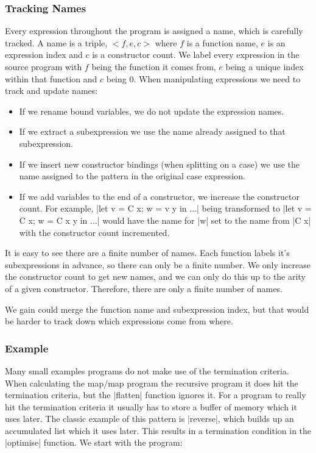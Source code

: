 \documentclass[draft]{sigplanconf}
\begin{document}
\subsubsection{Tracking Names}

Every expression throughout the program is assigned a name, which is carefully tracked. A name is a triple, $<f,e,c>$ where $f$ is a function name, $e$ is an expression index and $c$ is a constructor count. We label every expression in the source program with $f$ being the function it comes from, $e$ being a unique index within that function and $c$ being $0$. When manipulating expressions we need to track and update names:

\begin{itemize}
\item If we rename bound variables, we do not update the expression names.
\item If we extract a subexpression we use the name already assigned to that subexpression.
\item If we insert new constructor bindings (when splitting on a case) we use the name assigned to the pattern in the original case expression.
\item If we add variables to the end of a constructor, we increase the constructor count. For example, |let v = C x; w = v y in ...| being transformed to |let v = C x; w = C x y in ...| would have the name for |w| set to the name from |C x| with the constructor count incremented.
\end{itemize}

It is easy to see there are a finite number of names. Each function labels it's subexpressions in advance, so there can only be a finite number. We only increase the constructor count to get new names, and we can only do this up to the arity of a given constructor. Therefore, there are only a finite number of names.

We gain could merge the function name and subexpression index, but that would be harder to track down which expressions come from where.

\subsubsection{Example}

Many small examples programs do not make use of the termination criteria. When calculating the map/map program the recursive program it does hit the termination criteria, but the |flatten| function ignores it. For a program to really hit the termination criteria it usually has to store a buffer of memory which it uses later. The classic example of this pattern is |reverse|, which builds up an accumulated list which it uses later. This results in a termination condition in the |optimise| function. We start with the program:
\end{document}
